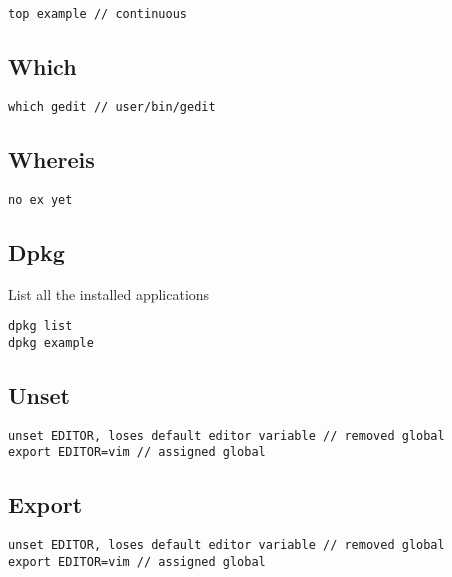 \begin{verbatim}
top example // continuous
\end{verbatim}

\subsection{Which}

\begin{verbatim}
which gedit // user/bin/gedit 
\end{verbatim}

\subsection{Whereis}

\begin{verbatim}
no ex yet
\end{verbatim}

\subsection{Dpkg}

List all the installed applications

\begin{verbatim}
dpkg list
dpkg example 
\end{verbatim}

\subsection{Unset}

\begin{verbatim}
unset EDITOR, loses default editor variable // removed global
export EDITOR=vim // assigned global
\end{verbatim}

\subsection{Export}

\begin{verbatim}
unset EDITOR, loses default editor variable // removed global
export EDITOR=vim // assigned global
\end{verbatim}

